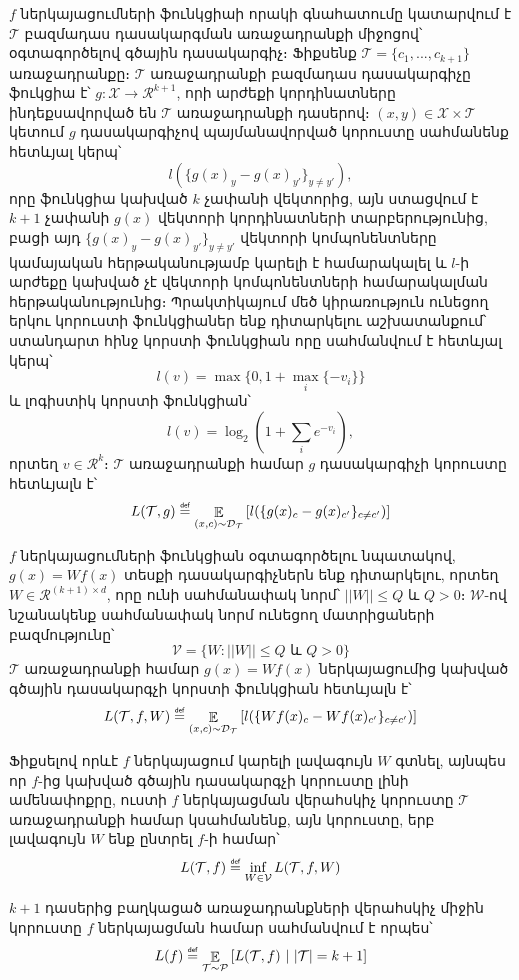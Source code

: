 \documentclass[12pt]{article}
\DeclareMathOperator*{\E}{\mathbb{E}}
\newcommand\defeq{\mathrel{\overset{\makebox[0pt]{\mbox{\normalfont\tiny\sffamily def}}}{=}}}
\begin{document}
\par $f$ ներկայացումների ֆունկցիաի որակի գնահատումը կատարվում է $\mathcal{T}$ բազմադաս դասակարգման առաջադրանքի միջոցով՝ օգտագործելով գծային դասակարգիչ։  Ֆիքսենք $\mathcal{T} = \{c_1, ..., c_{k+1}\}$ առաջադրանքը։ $\mathcal{T}$ առաջադրանքի բազմադաս դասակարգիչը ֆուկցիա է՝ $g:\mathcal{X} \rightarrow \mathcal{R}^{k+1}$, որի արժեքի կորդինատները ինդեքսավորված են $\mathcal{T}$ առաջադրանքի դասերով։ $(x, y) \in \mathcal{X} \times \mathcal{T}$ կետում $g$ դասակարգիչով պայմանավորված կորուստը սահմանենք հետևյալ կերպ՝
$$l(\{ g(x)_y-g(x)_{y'}\}_{y \neq y'}  ),$$
որը ֆունկցիա կախված $k$ չափանի վեկտորից,  այն ստացվում է $k+1$ չափանի  $g(x)$ վեկտորի կորդինատների տարբերությունից, բացի այդ $\{ g(x)_y-g(x)_{y'}\}_{y \neq y'}$ վեկտորի կոմպոնենտները կամայական հերթականությամբ կարելի է համարակալել և $l$-ի արժեքը կախված չէ վեկտորի կոմպոնենտների համարակալման հերթականությունից։  Պրակտիկայում մեծ կիրառություն ունեցող երկու կորուստի ֆունկցիաներ ենք դիտարկելու աշխատանքում՝ ստանդարտ հինջ կորստի ֆունկցիան որը սահմանվում է հետևյալ կերպ՝
$$l(v) = \max\{0, 1+\max_{i}\{-v_i\}\} $$ և լոգիստիկ կորստի ֆունկցիան՝
$$l(v) = \log_2(1+\sum_{i}{e^{-v_i}}),$$
որտեղ $v \in \mathcal{R}^k$։ $\mathcal{T}$ առաջադրանքի համար $g$ դասակարգիչի կորուստը հետևյալն է՝
$$L(\mathcal{T}, g) \defeq \E_{(x, c) \sim \mathcal{D}_{\mathcal{T}}} \left [ l(\{ g(x)_c-g(x)_{c'}\}_{c \neq c'}  ) \right ]$$

$f$ ներկայացումների ֆունկցիան օգտագործելու նպատակով,  $g(x) = Wf(x)$ տեսքի դասակարգիչներն ենք դիտարկելու, որտեղ $W \in \mathcal{R}^{(k+1)\times d }$, որը ունի սահմանափակ նորմ՝ $||W|| \leq Q \text{ և }Q >0։$
$\mathcal{W}$-ով նշանակենք սահմանափակ նորմ ունեցող մատրիցաների բազմությունը՝
$$\mathcal{V} = \{W: ||W|| \leq Q \text{ և } Q > 0\}$$
 $\mathcal{T}$ առաջադրանքի համար $g(x) = Wf(x)$ ներկայացումից կախված գծային դասակարգչի կորստի ֆունկցիան հետևյալն է՝
$$L(\mathcal{T}, f, W) \defeq \E_{(x, c) \sim \mathcal{D}_{\mathcal{T}}} \left [ l(\{ Wf(x)_c-Wf(x)_{c'}\}_{c \neq c'}  ) \right ]$$
 
 Ֆիքսելով որևէ $f$ ներկայացում կարելի լավագույն $W$ գտնել, այնպես որ $f$-ից կախված գծային դասակարգչի կորուստը լինի ամենափոքրը, ուստի $f$ ներկայացման վերահսկիչ կորուստը $\mathcal{T}$ առաջադրանքի համար կսահմանենք, այն կորուստը, երբ լավագույն $W$ ենք ընտրել $f$-ի համար՝
 $$L(\mathcal{T}, f) \defeq \inf_{W \in \mathcal{V}} L(\mathcal{T}, f, W)$$


\begin{defination}
$k+1$ դասերից բաղկացած առաջադրանքների վերահսկիչ միջին կորուստը $f$ ներկայացման համար սահմանվում է որպես՝ 
$$L(f) \defeq \E_{\mathcal{T} \sim \mathcal{P}} \left [L (\mathcal{T}, f) \text{ } | \text{ } |\mathcal{T}| = k+1\right]$$
\end{defination}
\end{document}
